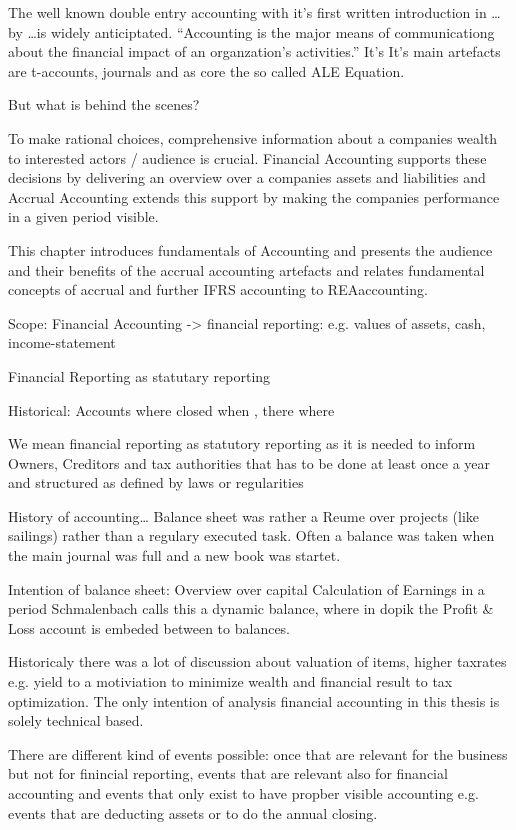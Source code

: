 The well known double entry accounting with it's first written introduction in \ldots by \ldots is widely anticiptated. %
\enquote{Accounting is the major means of communicationg about the financial impact of an organzation's activities.}\cite[p.3]{Horngren1984}
It's
It's main artefacts are t-accounts, journals and as core the so called ALE Equation.

But what is behind the scenes?


To make rational choices, comprehensive information about a companies wealth to interested actors / audience is crucial.
Financial Accounting supports these decisions by delivering an overview over a companies assets and liabilities and Accrual Accounting extends this support by making the companies performance in a given period visible.

This chapter introduces fundamentals of Accounting and presents the audience and their benefits of the accrual accounting artefacts and relates fundamental concepts of accrual and further IFRS accounting to REA\textcopyright accounting.

Scope: Financial Accounting -> financial reporting: e.g. values of assets, cash, income-statement

Financial Reporting as statutary reporting

Historical: Accounts where closed when , there where 

We mean financial reporting as statutory reporting as it is needed to inform Owners, Creditors and tax authorities that has to be done at least once a year and structured as defined by laws or regularities

History of accounting\dots
Balance sheet was rather a Reume over projects (like sailings) rather than a regulary executed task.
Often a balance was taken when the main journal was full and a new book was startet.

Intention of balance sheet:
Overview over capital
Calculation of Earnings in a period
Schmalenbach calls this a dynamic balance, where in dopik the Profit \& Loss account is embeded between to balances.

Historicaly there was a lot of discussion about valuation of items, higher taxrates e.g. yield to a motiviation to minimize wealth and financial result to tax optimization.
The only intention of analysis financial accounting in this thesis is solely technical based.

There are different kind of events possible: once that are relevant for the business but not for finincial reporting, events that are relevant also for financial accounting and events that only exist to have propber visible accounting e.g. events that are deducting assets or to do the annual closing.



